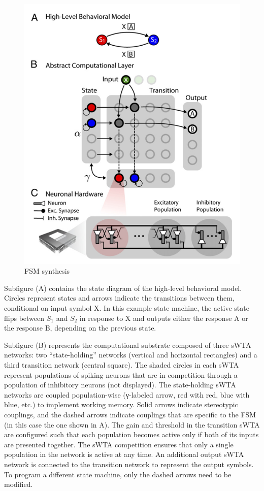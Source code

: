\documentclass[main]{subfiles}
\begin{document}
%
\begin{figure}[h]
    \centering
    \includegraphics[width=0.8\linewidth]{12_NeuromorphicSystems2/figures/nsm.PNG}
    \caption{FSM synthesis}
    \label{fig:nsm}
\end{figure}
%

 Subfigure (A) contains the state diagram of the high-level behavioral model. Circles represent states and arrows indicate the transitions between them, conditional on input symbol X. In this example state machine, the active state flips between $S_1$ and $S_2$ in response to X and outputs either the response A or the response B, depending on the previous state. 
 
 Subfigure (B) represents the computational substrate composed of three sWTA networks: two “state-holding” networks (vertical and horizontal rectangles) and a third transition network (central square). The shaded circles in each sWTA represent populations of spiking neurons that are in competition through a population of inhibitory neurons (not displayed). The state-holding sWTA networks are coupled population-wise (γ-labeled arrow, red with red, blue with blue, etc.) to implement working memory. Solid arrows indicate stereotypic couplings, and the dashed arrows indicate couplings that are specific to the FSM (in this case the one shown in A). The gain and threshold in the transition sWTA are configured such that each population becomes active only if both of its inputs are presented together. The sWTA competition ensures that only a single population in the network is active at any time. An additional output sWTA network is connected to the transition network to represent the output symbols. To program a different state machine, only the dashed arrows need to be modified. 
 
\end{document}
